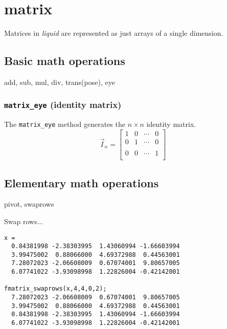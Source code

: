 % 
%
\section{matrix}
\label{module:matrix}
Matrices in {\it liquid} are represented as just arrays of a single dimension.

\subsection{Basic math operations}
\label{module:matrix:math}
add, sub, mul, div, trans(pose), eye

\subsubsection{{\tt matrix\_eye} (identity matrix)}
The {\tt matrix\_eye} method generates the $n \times n$ identity matrix.
\[
    \vec{I}_n = 
    \begin{bmatrix}
        1 & 0 & \cdots & 0 \\
        0 & 1 & \cdots & 0 \\
        \\
        0 & 0 & \cdots & 1 \\
    \end{bmatrix}
\]

\subsection{Elementary math operations}
\label{module:matrix:elementary}
pivot, swaprows

Swap rows...
\begin{verbatim}
x = 
  0.84381998 -2.38303995  1.43060994 -1.66603994
  3.99475002  0.88066000  4.69372988  0.44563001
  7.28072023 -2.06608009  0.67074001  9.80657005
  6.07741022 -3.93098998  1.22826004 -0.42142001

fmatrix_swaprows(x,4,4,0,2);
  7.28072023 -2.06608009  0.67074001  9.80657005
  3.99475002  0.88066000  4.69372988  0.44563001
  0.84381998 -2.38303995  1.43060994 -1.66603994
  6.07741022 -3.93098998  1.22826004 -0.42142001
\end{verbatim}

